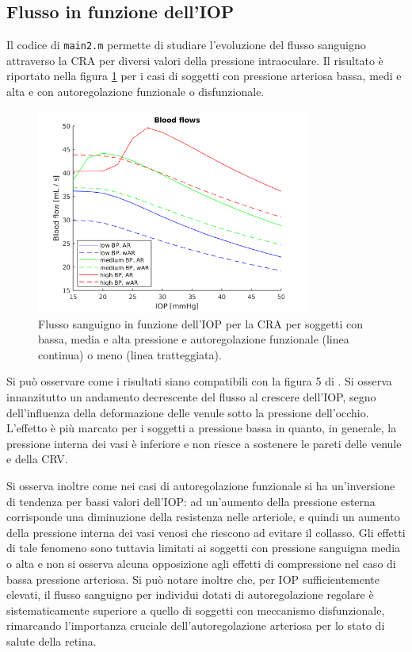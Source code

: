 \documentclass{article}
\begin{document}
\subsection{Flusso in funzione dell'IOP}
Il codice di \texttt{main2.m} permette di studiare l'evoluzione del flusso sanguigno attraverso la CRA per diversi valori della pressione intraoculare.
Il risultato è riportato nella figura \ref{fluxiop} per i casi di soggetti con pressione arteriosa bassa, medi e alta e con autoregolazione funzionale o disfunzionale.

\begin{figure}[h]
\begin{center}
\includegraphics[width=0.8\textwidth]{Pictures/bf_iop.png}
\caption{Flusso sanguigno in funzione dell'IOP per la CRA per soggetti con bassa, media e alta pressione e autoregolazione funzionale (linea continua) o meno (linea tratteggiata).}
\label{fluxiop}
\end{center}
\end{figure}

Si può osservare come i risultati siano compatibili con la figura 5 di \citep{art1}.
Si osserva innanzitutto un andamento decrescente del flusso al crescere dell'IOP, segno dell'influenza della deformazione delle venule sotto la pressione dell'occhio.
L'effetto è più marcato per i soggetti a pressione bassa in quanto, in generale, la pressione interna dei vasi è inferiore e non riesce a sostenere le pareti delle venule e della CRV.

Si osserva inoltre come nei casi di autoregolazione funzionale si ha un'inversione di tendenza per bassi valori dell'IOP: ad un'aumento della pressione esterna corrisponde una diminuzione della resistenza nelle arteriole, e quindi un aumento della pressione interna dei vasi venosi che riescono ad evitare il collasso.
Gli effetti di tale fenomeno sono tuttavia limitati ai soggetti con pressione sanguigna media o alta e non si osserva alcuna opposizione agli effetti di compressione nel caso di bassa pressione arteriosa.
Si può notare inoltre che, per IOP sufficientemente elevati, il flusso sanguigno per individui dotati di autoregolazione regolare è sistematicamente superiore a quello di soggetti con meccanismo disfunzionale, rimarcando l'importanza cruciale dell'autoregolazione arteriosa per lo stato di salute della retina.
\end{document}
